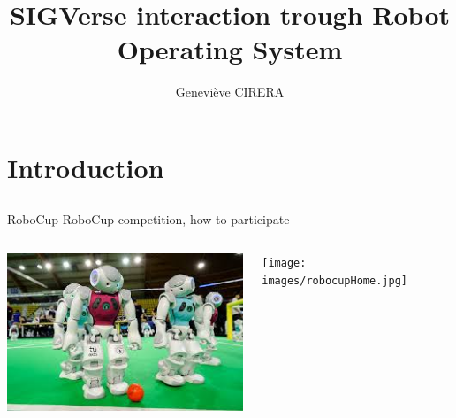 \documentclass[11pt]{beamer}
\title{SIGVerse interaction trough Robot Operating System}
\author{Geneviève CIRERA}\institute{Polytech'Nice-Sophia}
\date{\oldstylenums{\today}}
\begin{document}
\begin{frame}
\titlepage
\end{frame}



\section{Introduction}

\subsection*{}


\begin{frame}{RoboCup}		
	RoboCup competition, how to participate
	\begin{columns}[t]
		\begin{column}[T]{.5\textwidth}
			\includegraphics[width=1\textwidth]{images/robocupFoot.jpg}
		\end{column}
		\begin{column}[T]{.5\textwidth}
			\texttt{[image: images/robocupHome.jpg]}	
		\end{column}
	\end{columns}
\end{frame}
\end{document}
